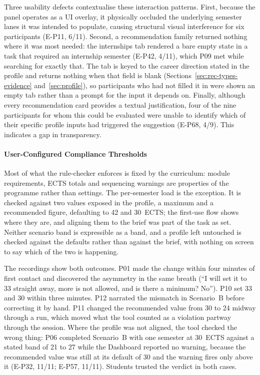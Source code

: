 Three usability defects contextualise these interaction patterns. First, because the panel operates as a UI overlay, it physically occluded the underlying semester lanes it was intended to populate, causing structural visual interference for six participants (E-P11, 6/11). Second, a recommendation family returned nothing where it was most needed: the internships tab rendered a bare empty state in a task that required an internship semester (E-P42, 4/11), which P09 met while searching for exactly that. The tab is keyed to the career direction stated in the profile and returns nothing when that field is blank (Sections~\ref{sec:rec-types-evidence} and~\ref{sec:profile}), so participants who had not filled it in were shown an empty tab rather than a prompt for the input it depends on. Finally, although every recommendation card provides a textual justification, four of the nine participants for whom this could be evaluated were unable to identify which of their specific profile inputs had triggered the suggestion (E-P68, 4/9). This indicates a gap in transparency.

\paragraph{User-Configured Compliance Thresholds}
\label{sec:eval-config}

Most of what the rule-checker enforces is fixed by the curriculum: module requirements, ECTS totals and sequencing warnings are properties of the programme rather than settings. The per-semester load is the exception. It is checked against two values exposed in the profile, a maximum and a recommended figure, defaulting to 42 and 30~ECTS; the first-use flow shows where they are, and aligning them to the brief was part of the task as set. Neither scenario band is expressible as a band, and a profile left untouched is checked against the defaults rather than against the brief, with nothing on screen to say which of the two is happening.

The recordings show both outcomes. P01 made the change within four minutes of first contact and discovered the asymmetry in the same breath (\enquote{I will set it to 33 straight away, more is not allowed, and is there a minimum? No}). P10 set 33 and 30 within three minutes. P12 narrated the mismatch in Scenario~B before correcting it by hand. P11 changed the recommended value from 30 to 24 midway through a run, which moved what the tool counted as a violation partway through the session. Where the profile was not aligned, the tool checked the wrong thing: P06 completed Scenario~B with one semester at 30~ECTS against a stated band of 21 to 27 while the Dashboard reported no warning, because the recommended value was still at its default of 30 and the warning fires only above it (E-P32, 11/11; E-P57, 11/11). Students trusted the verdict in both cases.

